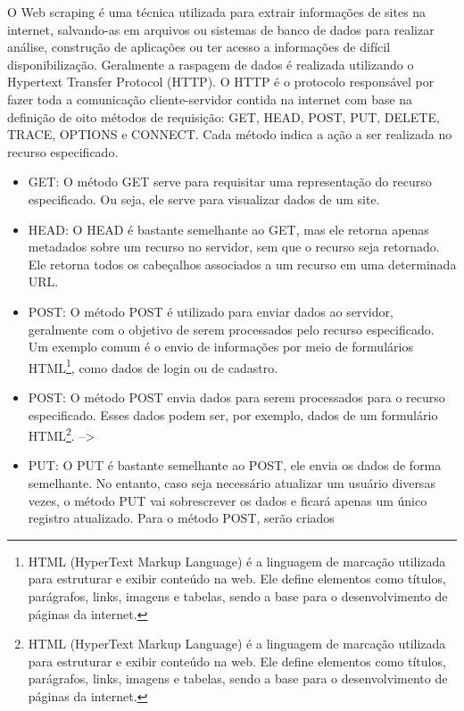 \documentclass[
  12pt,
  a4paper,
]{scrreprt}
\begin{document}
\vspace{12pt}

O Web scraping é uma técnica utilizada para extrair informações de sites
na internet, salvando-as em arquivos ou sistemas de banco de dados para
realizar análise, construção de aplicações ou ter acesso a informações
de difícil disponibilização. Geralmente a raspagem de dados é realizada
utilizando o Hypertext Transfer Protocol (HTTP). O HTTP é o protocolo
responsável por fazer toda a comunicação cliente-servidor contida na
internet com base na definição de oito métodos de requisição: GET, HEAD,
POST, PUT, DELETE, TRACE, OPTIONS e CONNECT. Cada método indica a ação a
ser realizada no recurso especificado.

\begin{itemize}
\item
  GET: O método GET serve para requisitar uma representação do recurso
  especificado. Ou seja, ele serve para visualizar dados de um site.
\item
  HEAD: O HEAD é bastante semelhante ao GET, mas ele retorna apenas
  metadados sobre um recurso no servidor, sem que o recurso seja
  retornado. Ele retorna todos os cabeçalhos associados a um recurso em
  uma determinada URL.
\item
  POST: O método POST é utilizado para enviar dados ao servidor,
  geralmente com o objetivo de serem processados pelo recurso
  especificado. Um exemplo comum é o envio de informações por meio de
  formulários HTML\footnote{HTML (HyperText Markup Language) é a
    linguagem de marcação utilizada para estruturar e exibir conteúdo na
    web. Ele define elementos como títulos, parágrafos, links, imagens e
    tabelas, sendo a base para o desenvolvimento de páginas da internet.},
  como dados de login ou de cadastro.
\item
  POST: O método POST envia dados para serem processados para o recurso
  especificado. Esses dados podem ser, por exemplo, dados de um
  formulário HTML\footnote{HTML (HyperText Markup Language) é a
    linguagem de marcação utilizada para estruturar e exibir conteúdo na
    web. Ele define elementos como títulos, parágrafos, links, imagens e
    tabelas, sendo a base para o desenvolvimento de páginas da internet.}.
  --\textgreater{}
\item
  PUT: O PUT é bastante semelhante ao POST, ele envia os dados de forma
  semelhante. No entanto, caso seja necessário atualizar um usuário
  diversas vezes, o método PUT vai sobrescrever os dados e ficará apenas
  um único registro atualizado. Para o método POST, serão criados

\end{itemize}
\end{document}

